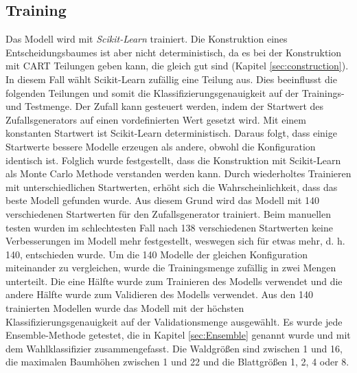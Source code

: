 \subsection{Training}
\label{sec:Training}
Das Modell wird mit \textit{Scikit-Learn} trainiert. Die Konstruktion eines Entscheidungsbaumes ist aber nicht deterministisch, da es bei der Konstruktion mit CART Teilungen geben kann, die gleich gut sind
(Kapitel \ref{sec:construction}). In diesem Fall wählt Scikit-Learn zufällig eine Teilung aus. Dies beeinflusst die folgenden Teilungen und somit die Klassifizierungsgenauigkeit auf der
Trainings- und Testmenge. Der Zufall kann gesteuert werden, indem der Startwert des Zufallsgenerators auf einen vordefinierten Wert gesetzt wird. Mit einem konstanten Startwert ist Scikit-Learn deterministisch.
\newline
\newline
Daraus folgt, dass einige Startwerte bessere Modelle erzeugen als andere, obwohl die Konfiguration identisch ist. Folglich wurde festgestellt, dass die Konstruktion mit Scikit-Learn als Monte Carlo Methode verstanden
werden kann. Durch wiederholtes Trainieren mit unterschiedlichen Startwerten, erhöht sich die Wahrscheinlichkeit, dass das beste Modell gefunden wurde. Aus diesem Grund wird das
Modell mit 140 verschiedenen Startwerten für den Zufallsgenerator trainiert. Beim manuellen testen wurden im schlechtesten Fall nach 138 verschiedenen Startwerten keine Verbesserungen im Modell mehr festgestellt,
weswegen sich für etwas mehr, d. h. 140, entschieden wurde.
\newline
\newline
Um die 140 Modelle der gleichen Konfiguration miteinander zu vergleichen, wurde die Trainingsmenge zufällig in zwei Mengen unterteilt. Die eine Hälfte wurde zum Trainieren des Modells verwendet und die andere
Hälfte wurde zum Validieren des Modells verwendet. Aus den 140 trainierten Modellen wurde das Modell mit der höchsten Klassifizierungsgenauigkeit auf der Validationsmenge ausgewählt.
\newline
\newline
Es wurde jede Ensemble-Methode getestet, die in Kapitel \ref{sec:Ensemble} genannt wurde und mit dem Wahlklassifizier zusammengefasst. Die Waldgrößen sind zwischen 1 und 16, die maximalen Baumhöhen zwischen
1 und 22 und die Blattgrößen 1, 2, 4 oder 8.

